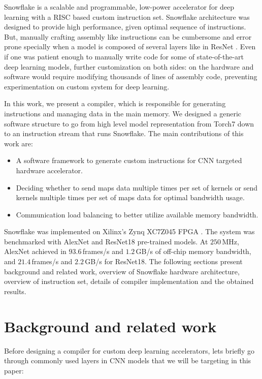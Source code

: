 \documentclass{sig-alternate}
\begin{document}
Snowflake \cite{snowflake} is a scalable and programmable, low-power accelerator for deep learning with a RISC based custom instruction set. Snowflake architecture was designed to provide high performance, given optimal sequence of instructions. But, manually crafting assembly like instructions can be cumbersome and error prone specially when a model is composed of several layers like in ResNet \cite{resnet}. Even if one was patient enough to manually write code for some of state-of-the-art deep learning models, further customization on both sides: on the hardware and software would require modifying thousands of lines of assembly code, preventing experimentation on custom system for deep learning. 

In this work, we present a compiler, which is responsible for generating instructions and managing data in the main memory. We designed a generic software structure to go from high level model representation from Torch7\cite{sw_torch7} down to an instruction stream that runs Snowflake. The main contributions of this work are:
\begin{itemize}  
\item A software framework to generate custom instructions for CNN targeted hardware accelerator.
\item Deciding whether to send maps data multiple times per set of kernels or send kernels multiple times per set of maps data for optimal bandwidth usage.
\item Communication load balancing to better utilize available memory bandwidth.
\end{itemize}

Snowflake was implemented on Xilinx's Zynq XC7Z045 FPGA \cite{xilinx:ZC706}. The system was benchmarked with AlexNet and ResNet18 \cite{alexnet_owt,resnet} pre-trained models. At $250$\,MHz, AlexNet achieved in $93.6$\,frames/s and $1.2$\,GB/s of off-chip memory bandwidth, and $21.4$\,frames/s and $2.2$\,GB/s for Res\-Net18. The following sections present background and related work, overview of Snowflake hardware architecture, overview of instruction set, details of compiler implementation and the obtained results.

\section{Background and related work}
Before designing a compiler for custom deep learning accelerators, lets briefly go through commonly used layers in CNN models that we will be targeting in this paper:
\end{document}
